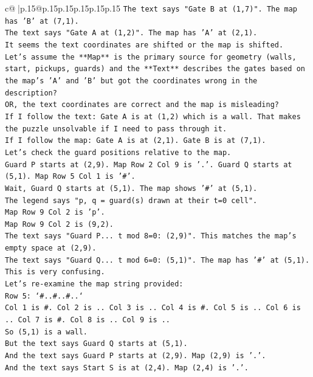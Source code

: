 \documentclass{article}
\begin{document}
{\begin{supertabular}{c@{$\;$}|p{.15\linewidth}@{}p{.15\linewidth}p{.15\linewidth}p{.15\linewidth}p{.15\linewidth}p{.15\linewidth}}
{{{\texttt{The text says "Gate B at (1,7)". The map has 'B' at (7,1).} \\
\texttt{The text says "Gate A at (1,2)". The map has 'A' at (2,1).} \\
\texttt{It seems the text coordinates are shifted or the map is shifted.} \\
\texttt{Let's assume the **Map** is the primary source for geometry (walls, start, pickups, guards) and the **Text** describes the gates based on the map's 'A' and 'B' but got the coordinates wrong in the description?} \\
\texttt{OR, the text coordinates are correct and the map is misleading?} \\
\texttt{If I follow the text: Gate A is at (1,2) which is a wall. That makes the puzzle unsolvable if I need to pass through it.} \\
\texttt{If I follow the map: Gate A is at (2,1). Gate B is at (7,1).} \\
\texttt{Let's check the guard positions relative to the map.} \\
\texttt{Guard P starts at (2,9). Map Row 2 Col 9 is '.'. Guard Q starts at (5,1). Map Row 5 Col 1 is '\#'.} \\
\texttt{Wait, Guard Q starts at (5,1). The map shows '\#' at (5,1).} \\
\texttt{The legend says "p, q = guard(s) drawn at their t=0 cell".} \\
\texttt{Map Row 9 Col 2 is 'p'.} \\
\texttt{Map Row 9 Col 2 is (9,2).} \\
\texttt{The text says "Guard P... t mod 8=0: (2,9)". This matches the map's empty space at (2,9).} \\
\texttt{The text says "Guard Q... t mod 6=0: (5,1)". The map has '\#' at (5,1).} \\
\texttt{This is very confusing.} \\
\texttt{Let's re{-}examine the map string provided:} \\
\texttt{Row 5: `\#..\#..\#..`} \\
\texttt{Col 1 is \#. Col 2 is .. Col 3 is .. Col 4 is \#. Col 5 is .. Col 6 is .. Col 7 is \#. Col 8 is .. Col 9 is ..} \\
\texttt{So (5,1) is a wall.} \\
\texttt{But the text says Guard Q starts at (5,1).} \\
\texttt{And the text says Guard P starts at (2,9). Map (2,9) is '.'.} \\
\texttt{And the text says Start S is at (2,4). Map (2,4) is '.'.} \\
}}}
\end{supertabular}}
\end{document}
